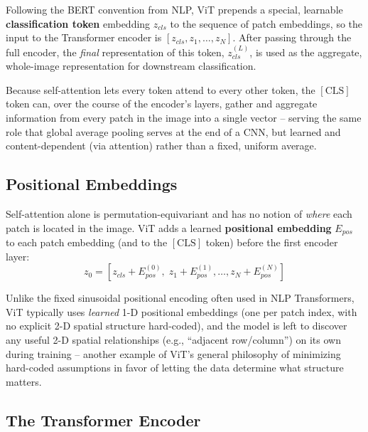 \documentclass[12pt,a4paper]{article}
\begin{document}
\begin{defbox}
Following the BERT convention from NLP, ViT prepends a special, learnable \textbf{classification token} embedding $z_{cls}$ to the sequence of patch embeddings, so the input to the Transformer encoder is $[z_{cls}, z_1, \ldots, z_N]$. After passing through the full encoder, the \emph{final} representation of this token, $z_{cls}^{(L)}$, is used as the aggregate, whole-image representation for downstream classification.
\end{defbox}

\begin{keyidea}
Because self-attention lets every token attend to every other token, the $[\text{CLS}]$ token can, over the course of the encoder's layers, gather and aggregate information from every patch in the image into a single vector -- serving the same role that global average pooling serves at the end of a CNN, but learned and content-dependent (via attention) rather than a fixed, uniform average.
\end{keyidea}

\subsection{Positional Embeddings}

Self-attention alone is permutation-equivariant and has no notion of \emph{where} each patch is located in the image. ViT adds a learned \textbf{positional embedding} $E_{pos}$ to each patch embedding (and to the $[\text{CLS}]$ token) before the first encoder layer:
\[
z_0 = [z_{cls} + E_{pos}^{(0)},\; z_1 + E_{pos}^{(1)}, \ldots, z_N + E_{pos}^{(N)}]
\]

\begin{keyidea}
Unlike the fixed sinusoidal positional encoding often used in NLP Transformers, ViT typically uses \emph{learned} 1-D positional embeddings (one per patch index, with no explicit 2-D spatial structure hard-coded), and the model is left to discover any useful 2-D spatial relationships (e.g., ``adjacent row/column'') on its own during training -- another example of ViT's general philosophy of minimizing hard-coded assumptions in favor of letting the data determine what structure matters.
\end{keyidea}

\subsection{The Transformer Encoder}
\end{document}
